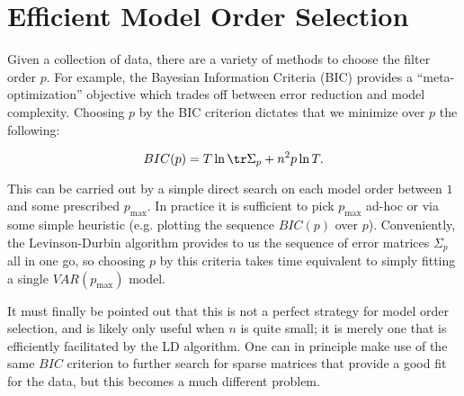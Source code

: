 \documentclass[12pt]{article}
\begin{document}
\section{Efficient Model Order Selection}
Given a collection of data, there are a variety of methods to choose
the filter order $p$.  For example, the Bayesian Information Criteria
(BIC) provides a ``meta-optimization'' objective which trades off
between error reduction and model complexity.  Choosing $p$ by the
BIC criterion dictates that we minimize over $p$ the following:

\begin{equation}
  \label{eqn:bic}
    BIC(p) = T \ln \tr \Sigma_p + n^2p\ln T.\\
\end{equation}

This can be carried out by a simple direct search on each model order
between $1$ and some prescribed $p_\text{max}$.  In practice it is
sufficient to pick $p_\text{max}$ ad-hoc or via some simple heuristic
(e.g. plotting the sequence $BIC(p)$ over $p$).  Conveniently, the
Levinson-Durbin algorithm provides to us the sequence of error
matrices $\Sigma_p$ all in one go, so choosing $p$ by this criteria
takes time equivalent to simply fitting a single $VAR(p_{\text{max}})$
model.

It must finally be pointed out that this is not a perfect strategy for
model order selection, and is likely only useful when $n$ is quite
small; it is merely one that is efficiently facilitated by the LD
algorithm.  One can in principle make use of the same $BIC$ criterion
to further search for sparse matrices that provide a good fit for the
data, but this becomes a much different problem.
\end{document}
